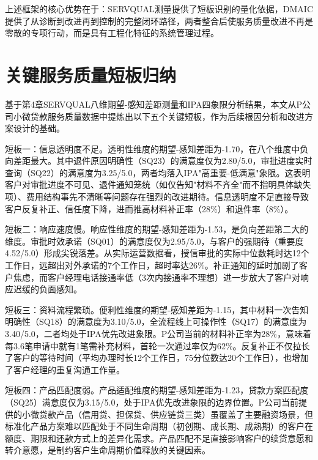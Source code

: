 上述框架的核心优势在于：SERVQUAL测量提供了短板识别的量化依据，DMAIC提供了从诊断到改进再到控制的完整闭环路径，两者整合后使服务质量改进不再是零散的专项行动，而是具有工程化特征的系统管理过程。\par

\section{关键服务质量短板归纳}

基于第4章SERVQUAL八维期望-感知差距测量和IPA四象限分析结果，本文从P公司小微贷款服务质量数据中提炼出以下五个关键短板，作为后续根因分析和改进方案设计的基础。\par

短板一：信息透明度不足。透明性维度的期望-感知差距为-1.70，在八个维度中负向差距最大。其中退件原因明确性（SQ23）的满意度仅为2.80/5.0，审批进度实时查询（SQ22）的满意度为3.25/5.0，两者均落入IPA"高重要-低满意"象限。这表明客户对审批进度不可见、退件通知笼统（如仅告知"材料不齐全"而不指明具体缺失项）、费用结构事先不清晰等问题存在强烈的改进期待\cite{ref15}。信息透明度不足直接导致客户反复补正、信任度下降，进而推高材料补正率（28\%）和退件率（8\%）。\par

短板二：响应速度慢。响应性维度的期望-感知差距为-1.53，是负向差距第二大的维度。审批时效承诺（SQ01）的满意度仅为2.95/5.0，与客户的强期待（重要度4.52/5.0）形成尖锐落差。从实际运营数据看，授信审批的实际中位数耗时达12个工作日，远超出对外承诺的7个工作日，超时率达26\%。补正通知的延时加剧了客户焦虑，而客户经理电话接通率低（3次内接通率不理想）进一步放大了客户对响应迟缓的负面感知。\par

短板三：资料流程繁琐。便利性维度的期望-感知差距为-1.15，其中材料一次告知明确性（SQ18）的满意度为3.10/5.0，全流程线上可操作性（SQ17）的满意度为3.40/5.0，二者均处于IPA优先改进象限。P公司当前的材料补正率为28\%，意味着每3.6笔申请中就有1笔需补充材料，首轮一次通过率仅为62\%。反复补正不仅拉长了客户的等待时间（平均办理时长12个工作日，75分位数达20个工作日），也增加了客户经理的重复沟通工作量。\par

短板四：产品匹配度弱。产品适配维度的期望-感知差距为-1.23，贷款方案匹配度（SQ25）满意度仅为3.15/5.0，处于IPA优先改进象限的边界位置。P公司当前提供的小微贷款产品（信用贷、担保贷、供应链贷三类）虽覆盖了主要融资场景，但标准化产品方案难以匹配处于不同生命周期（初创期、成长期、成熟期）的客户在额度、期限和还款方式上的差异化需求。产品匹配不足直接影响客户的续贷意愿和转介意愿，是制约客户生命周期价值释放的关键因素。\par

